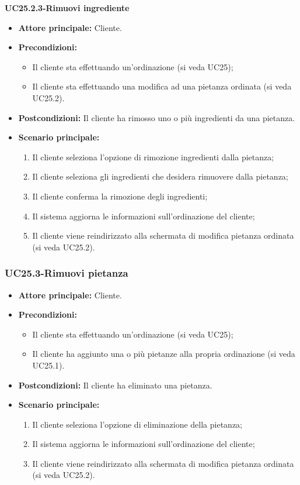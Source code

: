 \textbf{UC25.2.3-Rimuovi ingrediente}
\begin{itemize}
\item \textbf{Attore principale:} Cliente.
\item \textbf{Precondizioni:} 
\begin{itemize}
    \item Il cliente sta effettuando un'ordinazione (si veda UC25);
    \item Il cliente sta effettuando una modifica ad una pietanza ordinata (si veda UC25.2).
\end{itemize}
\item \textbf{Postcondizioni:} Il cliente ha rimosso uno o più ingredienti da una pietanza.
\item \textbf{Scenario principale:}
\begin{enumerate}
    \item Il cliente seleziona l'opzione di rimozione ingredienti dalla pietanza;
    \item Il cliente seleziona gli ingredienti che desidera rimuovere dalla pietanza;
    \item Il cliente conferma la rimozione degli ingredienti;
    \item Il sistema aggiorna le informazioni sull'ordinazione del cliente;
    \item Il cliente viene reindirizzato alla schermata di modifica pietanza ordinata (si veda UC25.2).
\end{enumerate}
\end{itemize}

\subsubsection{UC25.3-Rimuovi pietanza}
\begin{itemize}
\item \textbf{Attore principale:} Cliente.
\item \textbf{Precondizioni:} 
\begin{itemize}
    \item Il cliente sta effettuando un'ordinazione (si veda UC25);
    \item Il cliente ha aggiunto una o più pietanze alla propria ordinazione (si veda UC25.1).
\end{itemize}
\item \textbf{Postcondizioni:} Il cliente ha eliminato una pietanza.
\item \textbf{Scenario principale:}
\begin{enumerate}
    \item Il cliente seleziona l'opzione di eliminazione della pietanza;
    \item Il sistema aggiorna le informazioni sull'ordinazione del cliente;
    \item Il cliente viene reindirizzato alla schermata di modifica pietanza ordinata (si veda UC25.2).
\end{enumerate}
\end{itemize}

